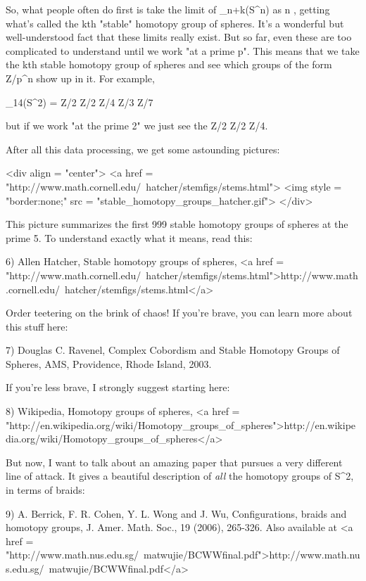 So, what people often do first is take the limit of
\pi _{n+k}(S^{n}) as n \to  \infty , getting what's
called the kth "stable" homotopy group of spheres.  It's a
wonderful but well-understood fact that these limits really exist.
But so far, even these are too complicated to understand until we work
"at a prime p".  This means that we take the kth stable
homotopy group of spheres and see which groups of the form Z/p^{n} show
up in it.  For example,

\pi _{14}(S^{2}) = Z/2 \times  Z/2 \times  Z/4 \times  Z/3 \times  Z/7

but if we work "at the prime 2" we just see the Z/2 \times  Z/2 \times  Z/4.

After all this data processing, we get some astounding pictures:

<div align = "center">
<a href = "http://www.math.cornell.edu/~hatcher/stemfigs/stems.html">
<img style = "border:none;" src = "stable_homotopy_groups_hatcher.gif">
</div>

This picture summarizes the first 999 stable homotopy groups of 
spheres at the prime 5.  To understand exactly what it means, read this:

6) Allen Hatcher, Stable homotopy groups of spheres,
<a href = "http://www.math.cornell.edu/~hatcher/stemfigs/stems.html">http://www.math.cornell.edu/~hatcher/stemfigs/stems.html</a>

Order teetering on the brink of chaos!  If you're brave, you can
learn more about this stuff here:

7) Douglas C. Ravenel, Complex Cobordism and Stable Homotopy Groups
of Spheres, AMS, Providence, Rhode Island, 2003.

If you're less brave, I strongly suggest starting here:

8) Wikipedia, Homotopy groups of spheres, 
<a href = "http://en.wikipedia.org/wiki/Homotopy_groups_of_spheres">http://en.wikipedia.org/wiki/Homotopy_groups_of_spheres</a>

But now, I want to talk about an amazing paper that pursues a
very different line of attack.  It gives a beautiful description 
of \emph{all} the homotopy groups of S^{2}, in terms of braids:

9) A. Berrick, F. R. Cohen, Y. L. Wong and J. Wu, Configurations, 
braids and homotopy groups, J. Amer. Math. Soc., 19 (2006), 265-326.
Also available at <a href = "http://www.math.nus.edu.sg/~matwujie/BCWWfinal.pdf">http://www.math.nus.edu.sg/~matwujie/BCWWfinal.pdf</a>

